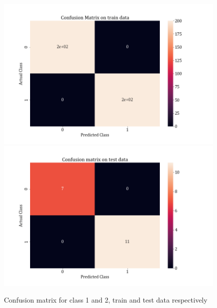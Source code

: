\documentclass[11pt,a4paper]{article}
\begin{document}
\begin{figure}[H]
\centering
\includegraphics[scale=0.4]{images/1A_ovo_conf12_train.png}
\includegraphics[scale=0.4]{images/1A_ovo_conf12_test.png}
\caption{Confusion matrix for class 1 and 2, train and test data respectively}
\end{figure}
\end{document}

